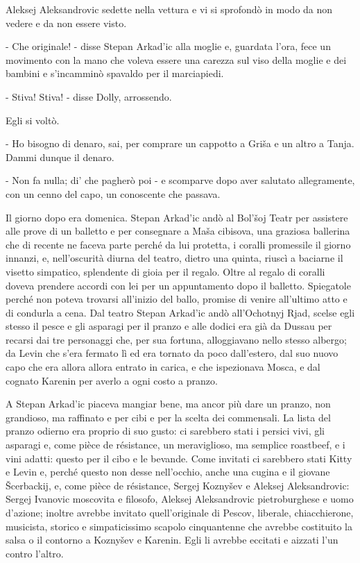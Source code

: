 Aleksej Aleksandrovic sedette nella vettura e vi si sprofondò in modo da non vedere e da non essere visto. 

- Che originale! - disse Stepan Arkad'ic alla moglie e, guardata l'ora, fece un movimento con la mano che voleva essere una carezza sul viso della moglie e dei bambini e s'incamminò spavaldo per il marciapiedi. 

- Stiva! Stiva! - disse Dolly, arrossendo. 

Egli si voltò. 

- Ho bisogno di denaro, sai, per comprare un cappotto a Griša e un altro a Tanja. Dammi dunque il denaro. 

- Non fa nulla; di' che pagherò poi - e scomparve dopo aver salutato allegramente, con un cenno del capo, un conoscente che passava. 

Il giorno dopo era domenica. Stepan Arkad'ic andò al Bol'šoj Teatr per assistere alle prove di un balletto e per consegnare a Maša cibisova, una graziosa ballerina che di recente ne faceva parte perché da lui protetta, i coralli promessile il giorno innanzi, e, nell'oscurità diurna del teatro, dietro una quinta, riuscì a baciarne il visetto simpatico, splendente di gioia per il regalo. Oltre al regalo di coralli doveva prendere accordi con lei per un appuntamento dopo il balletto. Spiegatole perché non poteva trovarsi all'inizio del ballo, promise di venire all'ultimo atto e di condurla a cena. Dal teatro Stepan Arkad'ic andò all'Ochotnyj Rjad, scelse egli stesso il pesce e gli asparagi per il pranzo e alle dodici era già da Dussau per recarsi dai tre personaggi che, per sua fortuna, alloggiavano nello stesso albergo; da Levin che s'era fermato lì ed era tornato da poco dall'estero, dal suo nuovo capo che era allora allora entrato in carica, e che ispezionava Mosca, e dal cognato Karenin per averlo a ogni costo a pranzo. 

A Stepan Arkad'ic piaceva mangiar bene, ma ancor più dare un pranzo, non grandioso, ma raffinato e per cibi e per la scelta dei commensali. La lista del pranzo odierno era proprio di suo gusto: ci sarebbero stati i persici vivi, gli asparagi e, come pièce de résistance, un meraviglioso, ma semplice roastbeef, e i vini adatti: questo per il cibo e le bevande. Come invitati ci sarebbero stati Kitty e Levin e, perché questo non desse nell'occhio, anche una cugina e il giovane Šcerbackij, e, come pièce de résistance, Sergej Koznyšev e Aleksej Aleksandrovic: Sergej Ivanovic moscovita e filosofo, Aleksej Aleksandrovic pietroburghese e uomo d'azione; inoltre avrebbe invitato quell'originale di Pescov, liberale, chiacchierone, musicista, storico e simpaticissimo scapolo cinquantenne che avrebbe costituito la salsa o il contorno a Koznyšev e Karenin. Egli li avrebbe eccitati e aizzati l'un contro l'altro. 

